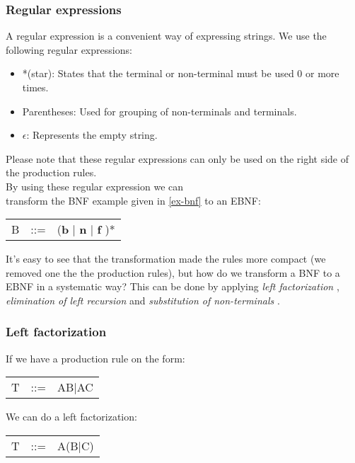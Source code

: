 	\subsubsection*{Regular expressions}
		A regular expression is a convenient way of expressing strings. We use the following regular expressions: \\
		\begin{itemize}
			\item *(star): States that the terminal or non-terminal must be used 0 or more times.
			\item Parentheses: Used for grouping of non-terminals and terminals.
			\item $\epsilon$: Represents the empty string.
		\end{itemize}
		Please note that these regular expressions can only be used on the right side of the production rules. \\
		
		By using these regular expression we can \\
		transform the BNF example given in \ref{ex-bnf} to an EBNF: \\
		
		\begin{tabular}{l l l}
			B		&	::=		&	({\bf b} $\mid$ {\bf n } $\mid$ {\bf f })* \\
		\end{tabular}
		
		It's easy to see that the transformation made the rules more compact (we removed one the the production rules), but
		how do we transform a BNF to a EBNF in a systematic way? 
		This can be done by applying {\it left factorization }, {\it elimination of left recursion} and {\it substitution of non-terminals }.
		
		\subsubsection*{Left factorization}
			If we have a production rule on the form: \\
			\begin{tabular}{l l l}
				T		&	::=		&	AB$\mid$AC \\
			\end{tabular}
			
			We can do a left factorization: \\
			\begin{tabular}{l l l}
				T		&	::=		&	A(B$\mid$C) \\
			\end{tabular}
			
